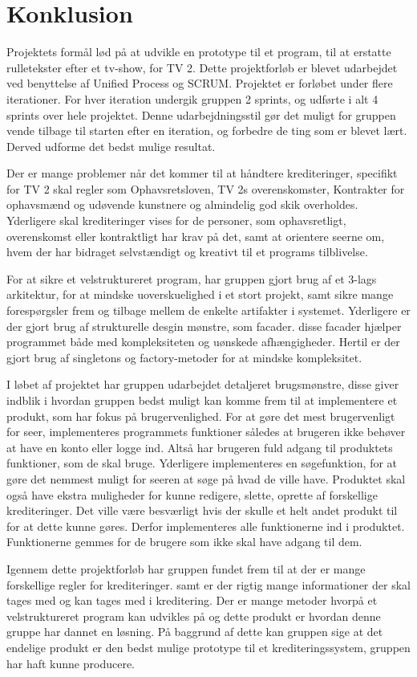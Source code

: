 \newpage
\section{Konklusion}
Projektets formål lød på at udvikle en prototype til et program, til at erstatte rulletekster efter et tv-show, for TV 2.
Dette projektforløb er blevet udarbejdet ved benyttelse af Unified Process og SCRUM. Projektet er forløbet under flere iterationer. For hver iteration undergik gruppen 2 sprints, og udførte i alt 4 sprints over hele projektet. Denne udarbejdningsstil gør det muligt for gruppen vende tilbage til starten efter en iteration, og forbedre de ting som er blevet lært. Derved udforme det bedst mulige resultat.

Der er mange problemer når det kommer til at håndtere krediteringer, specifikt for TV 2 skal regler som Ophavsretsloven, TV 2s overenskomster, Kontrakter for ophavsmænd og udøvende kunstnere og almindelig god skik overholdes. Yderligere skal krediteringer vises for de personer, som ophavsretligt, overenskomst eller kontraktligt har krav på det, samt at orientere seerne om, hvem der har bidraget selvstændigt og kreativt til et programs tilblivelse.

For at sikre et velstruktureret program, har gruppen gjort brug af et 3-lags arkitektur, for at mindske uoverskuelighed i et stort projekt, samt sikre mange forespørgsler frem og tilbage mellem de enkelte artifakter i systemet. Yderligere er der gjort brug af strukturelle desgin mønstre, som facader. disse facader hjælper programmet både med kompleksiteten og uønskede afhængigheder. Hertil er der gjort brug af singletons og factory-metoder for at mindske kompleksitet.

I løbet af projektet har gruppen udarbejdet detaljeret brugsmønstre, disse giver indblik i hvordan gruppen bedst muligt kan komme frem til at implementere et produkt, som har fokus på brugervenlighed. For at gøre det mest brugervenligt for seer, implementeres programmets funktioner således at brugeren ikke behøver at have en konto eller logge ind. Altså har brugeren fuld adgang til produktets funktioner, som de skal bruge. Yderligere implementeres en søgefunktion, for at gøre det nemmest muligt for seeren at søge på hvad de ville have. Produktet skal også have ekstra muligheder for kunne redigere, slette, oprette af forskellige krediteringer. Det ville være besværligt hvis der skulle et helt andet produkt til for at dette kunne gøres. Derfor implementeres alle funktionerne ind i produktet. Funktionerne gemmes for de brugere som ikke skal have adgang til dem. 

Igennem dette projektforløb har gruppen fundet frem til at der er mange forskellige regler for krediteringer. samt er der rigtig mange informationer der skal tages med og kan tages med i kreditering. Der er mange metoder hvorpå et velstruktureret program kan udvikles på og dette produkt er hvordan denne gruppe har dannet en løsning. 
På baggrund af dette kan gruppen sige at det endelige produkt er den bedst mulige prototype til et krediteringssystem, gruppen har haft kunne producere.